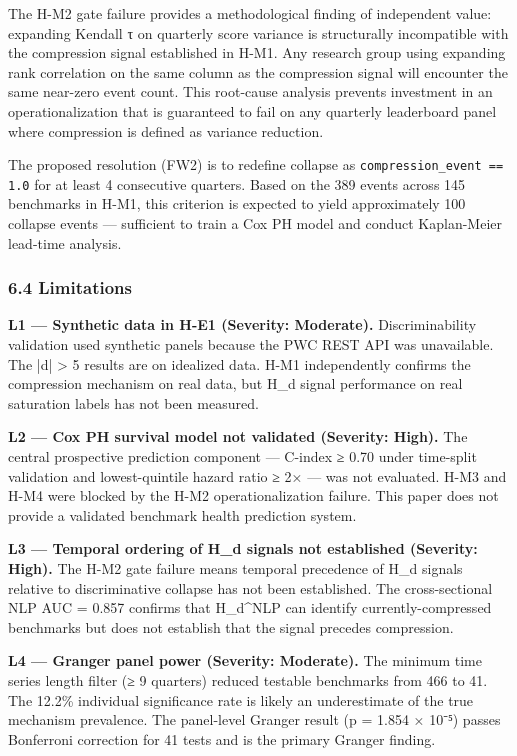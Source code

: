 The H-M2 gate failure provides a methodological finding of independent value: expanding Kendall τ on quarterly score variance is structurally incompatible with the compression signal established in H-M1. Any research group using expanding rank correlation on the same column as the compression signal will encounter the same near-zero event count. This root-cause analysis prevents investment in an operationalization that is guaranteed to fail on any quarterly leaderboard panel where compression is defined as variance reduction.

The proposed resolution (FW2) is to redefine collapse as \texttt{compression_event == 1.0} for at least 4 consecutive quarters. Based on the 389 events across 145 benchmarks in H-M1, this criterion is expected to yield approximately 100 collapse events — sufficient to train a Cox PH model and conduct Kaplan-Meier lead-time analysis.

\subsubsection{6.4 Limitations}

\textbf{L1 — Synthetic data in H-E1 (Severity: Moderate).} Discriminability validation used synthetic panels because the PWC REST API was unavailable. The |d| > 5 results are on idealized data. H-M1 independently confirms the compression mechanism on real data, but H_d signal performance on real saturation labels has not been measured.

\textbf{L2 — Cox PH survival model not validated (Severity: High).} The central prospective prediction component — C-index ≥ 0.70 under time-split validation and lowest-quintile hazard ratio ≥ 2× — was not evaluated. H-M3 and H-M4 were blocked by the H-M2 operationalization failure. This paper does not provide a validated benchmark health prediction system.

\textbf{L3 — Temporal ordering of H_d signals not established (Severity: High).} The H-M2 gate failure means temporal precedence of H_d signals relative to discriminative collapse has not been established. The cross-sectional NLP AUC = 0.857 confirms that H_d^NLP can identify currently-compressed benchmarks but does not establish that the signal precedes compression.

\textbf{L4 — Granger panel power (Severity: Moderate).} The minimum time series length filter (≥ 9 quarters) reduced testable benchmarks from 466 to 41. The 12.2\% individual significance rate is likely an underestimate of the true mechanism prevalence. The panel-level Granger result (p = 1.854 × 10⁻⁵) passes Bonferroni correction for 41 tests and is the primary Granger finding.

